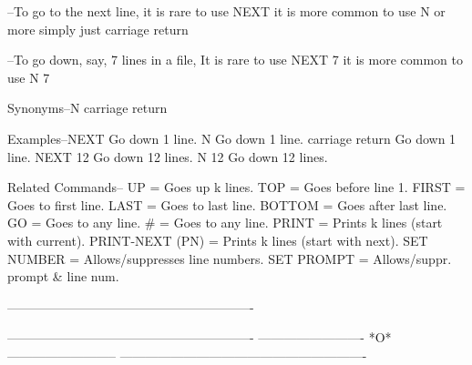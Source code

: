         --To go to the next line, it is rare to use
             NEXT
          it is more common to use
             N
          or more simply just
             carriage return
 
        --To go down, say, 7 lines in a file,
          It is rare to use
             NEXT 7
          it is more common to use
             N 7
 
Synonyms--N
          carriage return
 
Examples--NEXT               Go down 1 line.
          N                  Go down 1 line.
          carriage return    Go down 1 line.
          NEXT 12            Go down 12 lines.
          N 12               Go down 12 lines.
 
Related Commands--
          UP              = Goes up k lines.
          TOP             = Goes before line 1.
          FIRST           = Goes to first line.
          LAST            = Goes to last line.
          BOTTOM          = Goes after last line.
          GO              = Goes to any line.
          #               = Goes to any line.
          PRINT           = Prints k lines (start with current).
          PRINT-NEXT (PN) = Prints k lines (start with next).
          SET NUMBER      = Allows/suppresses line numbers.
          SET PROMPT      = Allows/suppr. prompt & line num.
 
----------------------------------------------------------
 
 
 
 
 
 
 
 
 
 
 
 
 
 
 
 
 
 
 
 
 
 
 
 
 
 
 
 
 
----------------------------------------------------------
-------------------------  *O*  --------------------------
----------------------------------------------------------
 
 
 
 
 
 
 
 
 
 
 
 
 
 
 
